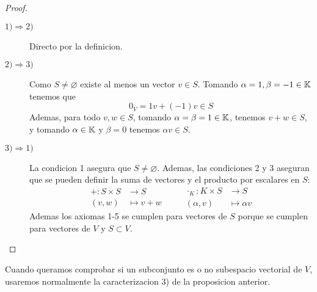 \begin{proof}
	\begin{description}
		\item[\(1) \Rightarrow 2) \)]  Directo por la definicion.
		\item[\(2) \Rightarrow 3)\)] Como \(S \neq \varnothing \) existe al menos un vector \(v \in S \). Tomando \(\alpha = 1, \beta = -1 \in \mathbb{K}\) tenemos que
			\[
				0_V = 1 v + (-1)v \in S
			\]
			Ademas, para todo \(v,w \in S\), tomando \(\alpha = \beta = 1 \in \mathbb{K} \), tenemos \(v + w \in S \), y tomando \(\alpha \in \mathbb{K} \) y \(\beta = 0\) tenemos \(\alpha v \in S \).

		\item[\(3) \Rightarrow 1)\)] La condicion 1 asegura que \(S \neq \varnothing \). Ademas, las condiciones 2 y 3 aseguran que se pueden definir la suma de vectores y el producto por escalares en \(S \):
			\[
				\begin{aligned}
					+ \colon S \times S & \longrightarrow S  \\
					(v,w )              & \longmapsto  v + w
				\end{aligned} \qquad \begin{aligned}
					\cdot_K \colon K \times S & \longrightarrow S     \\
					(\alpha,v )               & \longmapsto  \alpha v
				\end{aligned}
			\]
			Ademas los axiomas 1-5 se cumplen para vectores de \(S\) porque se cumplen para vectores de \(V \) y \(S \subset V \).
	\end{description}
\end{proof}
Cuando queramos comprobar si un subconjunto es o no subespacio vectorial de \(V \), usaremos normalmente la caracterizacion 3) de la proposicion anterior.
